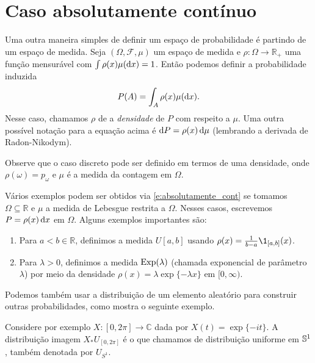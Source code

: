 \vfill
\pagebreak

\section{Caso absolutamente contínuo}

Uma outra maneira simples de definir um espaço de probabilidade é partindo de um espaço de medida.
Seja $(\Omega, \mathcal{F}, \mu)$ um espaço de medida e $\rho:\Omega \to \mathbb{R}_+$ uma função mensurável com $\int \rho(x) \mu(\mathop{}\!\mathrm{d} x) = 1$.
Então podemos definir a probabilidade induzida
\begin{equation}
  \label{e:absolutamente_cont}
  P(A) = \int_A \rho(x) \mu(\mathop{}\!\mathrm{d} x).
\end{equation}
Nesse caso, chamamos $\rho$ de a \emph{densidade}  de $P$ com respeito a $\mu$.
Uma outra possível notação para a equação acima é $\mathop{}\!\mathrm{d} P = \rho(x) \mathop{}\!\mathrm{d} \mu$  (lembrando a derivada de Radon-Nikodym).

Observe que o caso discreto pode ser definido em termos de uma densidade, onde $\rho(\omega) = p_\omega$ e $\mu$ é a medida da contagem em $\Omega$.

\begin{example}
  Vários exemplos podem ser obtidos via \eqref{e:absolutamente_cont} se tomamos $\Omega \subseteq \mathbb{R}$ e $\mu$ a medida de Lebesgue restrita a $\Omega$.
  Nesses casos, escrevemos $P = \rho(x) \mathop{}\!\mathrm{d} x$ em $\Omega$.
  Alguns exemplos importantes são:
  \begin{enumerate}[\quad a)]
  \item Para $a < b \in \mathbb{R}$, definimos a medida $U[a,b]$  usando $\rho(x) = \tfrac{1}{b-a}\1_{[a,b]}(x)$.
  \item Para $\lambda > 0$, definimos a medida $\operatorname{Exp}(\lambda)$  (chamada exponencial de parâmetro $\lambda$) por meio da densidade $\rho(x) = \lambda \exp\{-\lambda x\}$ em $[0,\infty)$.
  \end{enumerate}
\end{example}

Podemos também usar a distribuição de um elemento aleatório para construir outras probabilidades, como mostra o seguinte exemplo.

\begin{example}
  Considere por exemplo $X:[0,2\pi] \to \mathbb{C}$ dada por $X(t) = \exp\{-i t\}$.
  A distribuição imagem $X_*U_{[0,2\pi]}$ é o que chamamos de distribuição uniforme em ${\mathbb S}^1$, também denotada por $U_{S^1}$.
\end{example}

